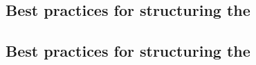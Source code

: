 


\subsection{Best practices for structuring the \gdtestcasebrowser{}}
\label{BPCategories}



\subsection{Best practices for structuring the \gdomeditor{}}
\label{BPOMCategories}


